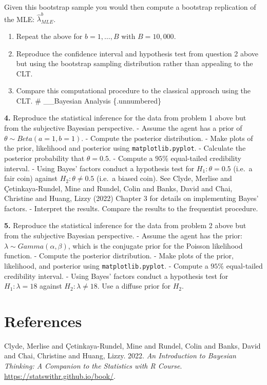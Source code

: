 \documentclass[
  letterpaper,
  DIV=11,
  numbers=noendperiod]{scrartcl}
\newlength{\cslhangindent}
\newlength{\cslentryspacingunit} %
\newenvironment{CSLReferences}[2] %
 {%
  \setlength{\parindent}{0pt}
  \ifodd #1
  \let\oldpar\par
  \def\par{\hangindent=\cslhangindent\oldpar}
  \fi
  \setlength{\parskip}{#2\cslentryspacingunit}
 }%
 {}
\begin{document}
Given this bootstrap sample you would then compute a bootstrap
replication of the MLE: \(\hat{\lambda}^{b}_{MLE}\).

\begin{enumerate}
\def\labelenumi{\alph{enumi}.}
\setcounter{enumi}{1}
\item
  Repeat the above for \(b = 1, \ldots, B\) with \(B = 10,000\).
\item
  Reproduce the confidence interval and hypothesis test from question 2
  above but using the bootstrap sampling distribution rather than
  appealing to the CLT.
\item
  Compare this computational procedure to the classical approach using
  the CLT. \# \_\_Bayesian Analysis \{.unnumbered\}
\end{enumerate}

\textbf{4.} Reproduce the statistical inference for the data from
problem 1 above but from the subjective Bayesian perspective. - Assume
the agent has a prior of \(\theta \sim Beta(a=1, b=1)\). - Compute the
posterior distribution. - Make plots of the prior, likelihood and
posterior using \texttt{matplotlib.pyplot}. - Calculate the posterior
probability that \(\theta = 0.5\). - Compute a \(95\%\) equal-tailed
credibility interval. - Using Bayes' factors conduct a hypothesis test
for \(H_{1}: \theta = 0.5\) (i.e.~a fair coin) against
\(H_{2}: \theta \ne 0.5\) (i.e.~a biased coin). See Clyde, Merlise and
Çetinkaya-Rundel, Mine and Rundel, Colin and Banks, David and Chai,
Christine and Huang, Lizzy (2022) Chapter 3 for details on implementing
Bayes' factors. - Interpret the results. Compare the results to the
frequentist procedure.

\textbf{5.} Reproduce the statistical inference for the data from
problem 2 above but from the subjective Bayesian perspective. - Assume
the agent has the prior: \(\lambda \sim Gamma(\alpha, \beta)\), which is
the conjugate prior for the Poisson likelihood function. - Compute the
posterior distribution. - Make plots of the prior, likelihood, and
posterior using \texttt{matplotlib.pyplot}. - Compute a \(95\%\)
equal-tailed credibility interval. - Using Bayes' factors conduct a
hypothesis test for \(H_{1}: \lambda = 18\) against
\(H_{2}: \lambda \ne 18\). Use a diffuse prior for \(H_{2}\).

\newpage

\section*{References}\label{references}

\label{refs}
\begin{CSLReferences}{1}{0}
Clyde, Merlise and Çetinkaya-Rundel, Mine and Rundel, Colin and Banks,
David and Chai, Christine and Huang, Lizzy. 2022. \emph{{An Introduction
to Bayesian Thinking}: {A Companion to the Statistics with R Course}}.
\url{https://statswithr.github.io/book/}.

\end{CSLReferences}
\end{document}
